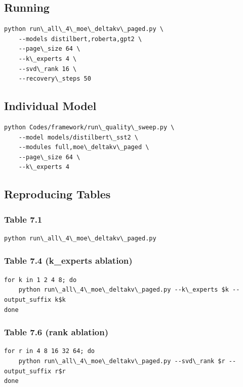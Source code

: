 \subsection{Running}

\begin{lstlisting}
python run\_all\_4\_moe\_deltakv\_paged.py \
    --models distilbert,roberta,gpt2 \
    --page\_size 64 \
    --k\_experts 4 \
    --svd\_rank 16 \
    --recovery\_steps 50
\end{lstlisting}

\subsection{Individual Model}

\begin{lstlisting}
python Codes/framework/run\_quality\_sweep.py \
    --model models/distilbert\_sst2 \
    --modules full,moe\_deltakv\_paged \
    --page\_size 64 \
    --k\_experts 4
\end{lstlisting}

\subsection{Reproducing Tables}

\subsubsection{Table 7.1}
\begin{lstlisting}
python run\_all\_4\_moe\_deltakv\_paged.py
\end{lstlisting}

\subsubsection{Table 7.4 (k\_experts ablation)}
\begin{lstlisting}
for k in 1 2 4 8; do
    python run\_all\_4\_moe\_deltakv\_paged.py --k\_experts $k --output_suffix k$k
done
\end{lstlisting}

\subsubsection{Table 7.6 (rank ablation)}
\begin{lstlisting}
for r in 4 8 16 32 64; do
    python run\_all\_4\_moe\_deltakv\_paged.py --svd\_rank $r --output_suffix r$r
done
\end{lstlisting}

